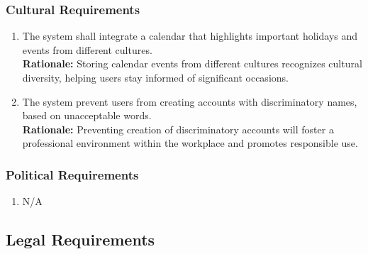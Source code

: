 \documentclass[]{article}
\begin{document}
\subsubsection{Cultural Requirements}
\label{ssub:cultural_requirements}
\begin{enumerate}[{CP-C}1. ]
    \item The system shall integrate a calendar that highlights important holidays and events from different cultures. \\
    {\bf Rationale:} Storing calendar events from different cultures recognizes cultural diversity, helping users stay informed 
    of significant occasions. 
    \item The system prevent users from creating accounts with discriminatory names, based on unacceptable words. \\
    {\bf Rationale:} Preventing creation of discriminatory accounts will foster a professional environment within the workplace and 
    promotes responsible use.
\end{enumerate}
\subsubsection{Political Requirements}
\label{ssub:political_requirements}
\begin{enumerate}[{CP-P}1. ]
    \item N/A
\end{enumerate}




\subsection{Legal Requirements}
\label{sub:legal_requirements}
\end{document}

